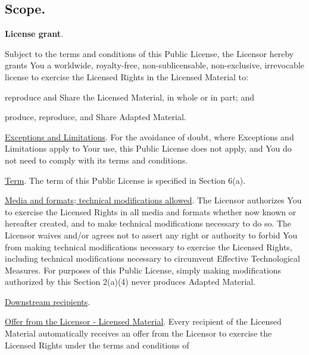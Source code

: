   \subsection{Scope.}
    \begin{myEnumerate}
      \item \textbf{License grant}.
      \begin{myEnumerate}
         \item Subject to the terms and conditions of this Public License, the Licensor hereby grants You a worldwide,
         royalty-free, non-sublicensable, non-exclusive, irrevocable license to exercise the Licensed Rights in the Licensed
         Material to:
         \begin{myEnumerate}
           \item reproduce and Share the Licensed Material, in whole or in part; and
           \item produce, reproduce, and Share Adapted Material.
         \end{myEnumerate}
         \item \underline{Exceptions and Limitations}. For the avoidance of doubt, where Exceptions and Limitations apply to
         Your use, this Public License does not apply, and You do not need to comply with its terms and conditions.
         \item \underline{Term}. The term of this Public License is specified in Section 6(a).
         \item \underline{Media and formats; technical modifications allowed}. The Licensor authorizes You to exercise the
         Licensed Rights in all media and formats whether now known or hereafter created, and to make technical modifications
         necessary to do so. The Licensor waives and/or agrees not to assert any right or authority to forbid You from making
         technical modifications necessary to exercise the Licensed Rights, including technical modifications necessary to
         circumvent Effective Technological Measures. For purposes of this Public License, simply making modifications
         authorized by this Section 2(a)(4) never produces Adapted Material.
         \item \underline{Downstream recipients}.
         \begin{myEnumerate}
           \item \underline{Offer from the Licensor - Licensed Material}. Every recipient of the Licensed Material
           automatically receives an offer from the Licensor to exercise the Licensed Rights under the terms and conditions of

\end{myEnumerate}
\end{myEnumerate}
\end{myEnumerate}
